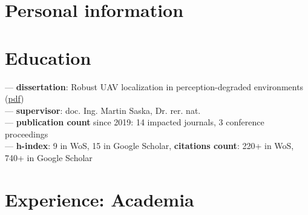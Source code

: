 \documentclass[11pt,a4paper,sans]{moderncv} %
\newcommand\Colorhref[3][color1]{\href{#2}{\small\color{#1}#3}}
\begin{document}
\makecvtitle %



\section{Personal information}




\section{Education}

{ --- \textbf{dissertation}: Robust UAV localization in perception-degraded environments (\Colorhref{https://mrs.fel.cvut.cz/data/papers/petracek_phd_thesis.pdf}{pdf})\\
  --- \textbf{supervisor}: doc. Ing. Martin Saska, Dr. rer. nat.\\
  --- \textbf{publication count} since 2019: 14 impacted journals, 3 conference proceedings\\
  --- \textbf{h-index}: 9 in WoS, 15 in Google Scholar, \textbf{citations count}: 220+ in WoS, 740+ in Google Scholar}


\section{Experience: Academia}
\end{document}
